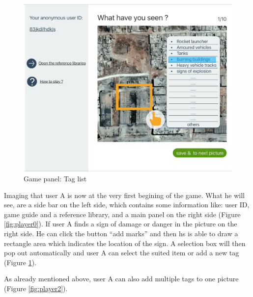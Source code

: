       \noindent\begin{minipage}{.45\textwidth}
      \begin{figure}[H]
      \centering
      \includegraphics[width=\textwidth]{figures/function-player-1}
      \caption{Game panel: Tag list\cite{satellite-photo-1}}
      \label{fig:player1}
      \end{figure}
      \end{minipage}\hfill

      Imaging that user A is now at the very first begining of the game.
      What he will see,
      are a side bar on the left side,
      which contains some information like:
      user ID,
      game guide and a reference library,
      and a main panel on the right side (Figure \ref{fig:player0}).
      If user A finds a sign of damage or danger in the picture on the right side.
      He can click the button ``add marks'' and then hs is able to draw a rectangle area which indicates the location of the sign.
      A selection box will then pop out automatically and user A can select the suited item or add a new tag (Figure \ref{fig:player1}).

      As already mentioned above,
      user A can also add multiple tags to one picture (Figure \ref{fig:player2}).

